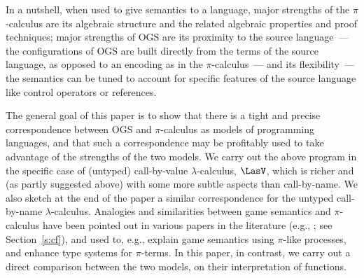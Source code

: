 In a nutshell, when  used to give semantics to a language, 
major strengths of the $\pi$-calculus are its algebraic structure and the related algebraic
properties and proof techniques;
major strengths of     OGS   are its proximity to the source
language~--- the configurations of OGS are built directly from the terms of the source
language,  as opposed to an encoding as in the $\pi$-calculus~--- 
and its flexibility~--- the semantics can be tuned to account for specific features of the
source language like control operators or references. 

The general goal of this paper is to show that there is a tight and precise correspondence
between OGS and $\pi$-calculus as models of programming languages, and that such a
correspondence may be profitably used to take advantage of the strengths of the two models. 
We carry out the above program in the specific case of (untyped) call-by-value
$\lambda$-calculus,  $\LasV$, 
which is richer and (as partly suggested above) with some more subtle
aspects than call-by-name.
We also sketch at the end of the paper a similar correspondence for the
untyped call-by-name $\lambda$-calculus.
Analogies and similarities between game semantics and  $\pi$-calculus have  been
pointed  out in various papers in the literature (e.g., \cite{10.1145/224164.224189,berger2001sequentiality}; see
Section~\ref{s:cf}), and used to, e.g., explain game semantics using $\pi$-like processes,
and enhance type systems for $\pi$-terms.  In this paper, in contrast, we carry out a direct comparison
between the two models, on their interpretation of functions.    


